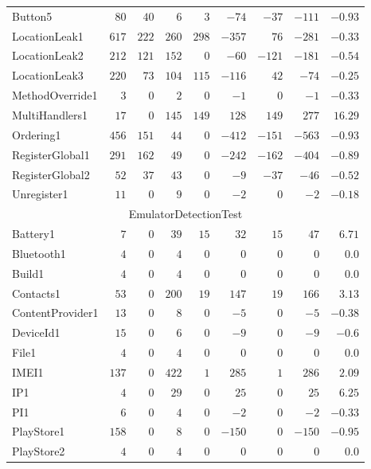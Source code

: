 \documentclass[../draft.tex]{subfiles}
\newcommand{\tsubEight}[1]{\multicolumn{9}{c}{#1}\\\hline}
\begin{document}
\begin{longtable}{l | r | r | r | r | r | r | r | r}
        Button5 & $80$ & $40$ & $6$ & $3$ & $-74$ & $-37$ & $-111$ & $-0.93$\\
        LocationLeak1 & $617$ & $222$ & $260$ & $298$ & $-357$ & $76$ & $-281$ & $-0.33$\\
        LocationLeak2 & $212$ & $121$ & $152$ & $0$ & $-60$ & $-121$ & $-181$ & $-0.54$\\
        LocationLeak3 & $220$ & $73$ & $104$ & $115$ & $-116$ & $42$ & $-74$ & $-0.25$\\
        MethodOverride1 & $3$ & $0$ & $2$ & $0$ & $-1$ & $0$ & $-1$ & $-0.33$\\
        MultiHandlers1 & $17$ & $0$ & $145$ & $149$ & $128$ & $149$ & $277$ & $16.29$\\
        Ordering1 & $456$ & $151$ & $44$ & $0$ & $-412$ & $-151$ & $-563$ & $-0.93$\\
        RegisterGlobal1 & $291$ & $162$ & $49$ & $0$ & $-242$ & $-162$ & $-404$ & $-0.89$\\
        RegisterGlobal2 & $52$ & $37$ & $43$ & $0$ & $-9$ & $-37$ & $-46$ & $-0.52$\\
        Unregister1 & $11$ & $0$ & $9$ & $0$ & $-2$ & $0$ & $-2$ & $-0.18$\\
        \hline
        \tsubEight{EmulatorDetectionTest}
        Battery1 & $7$ & $0$ & $39$ & $15$ & $32$ & $15$ & $47$ & $6.71$\\
        Bluetooth1 & $4$ & $0$ & $4$ & $0$ & $0$ & $0$ & $0$ & $0.0$\\
        Build1 & $4$ & $0$ & $4$ & $0$ & $0$ & $0$ & $0$ & $0.0$\\
        Contacts1 & $53$ & $0$ & $200$ & $19$ & $147$ & $19$ & $166$ & $3.13$\\
        ContentProvider1 & $13$ & $0$ & $8$ & $0$ & $-5$ & $0$ & $-5$ & $-0.38$\\
        DeviceId1 & $15$ & $0$ & $6$ & $0$ & $-9$ & $0$ & $-9$ & $-0.6$\\
        File1 & $4$ & $0$ & $4$ & $0$ & $0$ & $0$ & $0$ & $0.0$\\
        IMEI1 & $137$ & $0$ & $422$ & $1$ & $285$ & $1$ & $286$ & $2.09$\\
        IP1 & $4$ & $0$ & $29$ & $0$ & $25$ & $0$ & $25$ & $6.25$\\
        PI1 & $6$ & $0$ & $4$ & $0$ & $-2$ & $0$ & $-2$ & $-0.33$\\
        PlayStore1 & $158$ & $0$ & $8$ & $0$ & $-150$ & $0$ & $-150$ & $-0.95$\\
        PlayStore2 & $4$ & $0$ & $4$ & $0$ & $0$ & $0$ & $0$ & $0.0$\\

\end{longtable}
\end{document}
